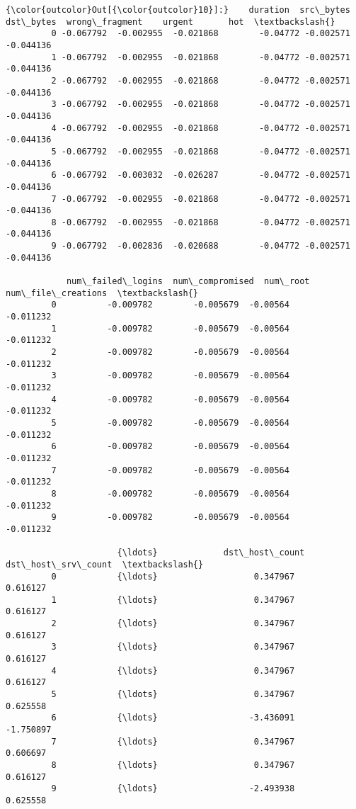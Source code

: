 \documentclass[11pt]{article}
\begin{document}
\begin{Verbatim}[commandchars=\\\{\}]
{\color{outcolor}Out[{\color{outcolor}10}]:}    duration  src\_bytes  dst\_bytes  wrong\_fragment    urgent       hot  \textbackslash{}
         0 -0.067792  -0.002955  -0.021868        -0.04772 -0.002571 -0.044136   
         1 -0.067792  -0.002955  -0.021868        -0.04772 -0.002571 -0.044136   
         2 -0.067792  -0.002955  -0.021868        -0.04772 -0.002571 -0.044136   
         3 -0.067792  -0.002955  -0.021868        -0.04772 -0.002571 -0.044136   
         4 -0.067792  -0.002955  -0.021868        -0.04772 -0.002571 -0.044136   
         5 -0.067792  -0.002955  -0.021868        -0.04772 -0.002571 -0.044136   
         6 -0.067792  -0.003032  -0.026287        -0.04772 -0.002571 -0.044136   
         7 -0.067792  -0.002955  -0.021868        -0.04772 -0.002571 -0.044136   
         8 -0.067792  -0.002955  -0.021868        -0.04772 -0.002571 -0.044136   
         9 -0.067792  -0.002836  -0.020688        -0.04772 -0.002571 -0.044136   
         
            num\_failed\_logins  num\_compromised  num\_root  num\_file\_creations  \textbackslash{}
         0          -0.009782        -0.005679  -0.00564           -0.011232   
         1          -0.009782        -0.005679  -0.00564           -0.011232   
         2          -0.009782        -0.005679  -0.00564           -0.011232   
         3          -0.009782        -0.005679  -0.00564           -0.011232   
         4          -0.009782        -0.005679  -0.00564           -0.011232   
         5          -0.009782        -0.005679  -0.00564           -0.011232   
         6          -0.009782        -0.005679  -0.00564           -0.011232   
         7          -0.009782        -0.005679  -0.00564           -0.011232   
         8          -0.009782        -0.005679  -0.00564           -0.011232   
         9          -0.009782        -0.005679  -0.00564           -0.011232   
         
                      {\ldots}             dst\_host\_count  dst\_host\_srv\_count  \textbackslash{}
         0            {\ldots}                   0.347967            0.616127   
         1            {\ldots}                   0.347967            0.616127   
         2            {\ldots}                   0.347967            0.616127   
         3            {\ldots}                   0.347967            0.616127   
         4            {\ldots}                   0.347967            0.616127   
         5            {\ldots}                   0.347967            0.625558   
         6            {\ldots}                  -3.436091           -1.750897   
         7            {\ldots}                   0.347967            0.606697   
         8            {\ldots}                   0.347967            0.616127   
         9            {\ldots}                  -2.493938            0.625558   
         

\end{Verbatim}
\end{document}
